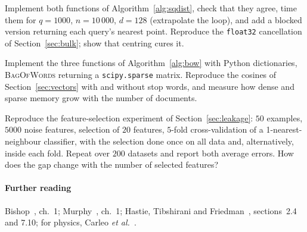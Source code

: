 \documentclass[11pt]{article}
\begin{document}
\begin{questions}
\begin{programming}
\item Implement both functions of Algorithm~\ref{alg:sqdist}, check that they agree, time them for $q = 1000$,
$n = 10\,000$, $d = 128$ (extrapolate the loop), and add a blocked version returning each query's nearest point.
Reproduce the \texttt{float32} cancellation of Section~\ref{sec:bulk}; show that centring cures it.
\item Implement the three functions of Algorithm~\ref{alg:bow} with Python dictionaries, \textsc{BagOfWords} returning
a \texttt{scipy.sparse} matrix. Reproduce the cosines of Section~\ref{sec:vectors} with and without stop words, and
measure how dense and sparse memory grow with the number of documents.
\item Reproduce the feature-selection experiment of Section~\ref{sec:leakage}: $50$ examples, $5000$ noise features,
selection of $20$ features, $5$-fold cross-validation of a 1-nearest-neighbour classifier, with the selection done
once on all data and, alternatively, inside each fold. Repeat over $200$ datasets and report both average errors.
How does the gap change with the number of selected features?
\end{programming}
\end{questions}

\paragraph{Further reading} Bishop~\cite{bishop2006}, ch.~1; Murphy~\cite{murphy2022}, ch.~1; Hastie, Tibshirani and
Friedman~\cite{hastie2009}, sections~2.4 and 7.10; for physics, Carleo \emph{et al.}~\cite{carleo2019}.
\end{document}
